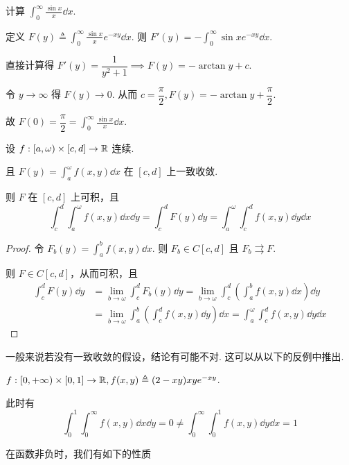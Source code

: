 \begin{example}
    计算 $\displaystyle\int_0^\infty\frac{\sin x}{x}\dd x$.

    定义 $F(y)\triangleq\displaystyle\int_0^\infty\frac{\sin x}{x}e^{-xy}\dd x$. 则 $F'(y)=-\displaystyle\int_0^\infty \sin x e^{-xy}\dd x$.

    直接计算得 $F'(y)=\dfrac{1}{y^2+1}\implies F(y)=-\arctan y+c$.

    令 $y\to\infty$ 得 $F(y)\to 0$. 从而 $c=\dfrac{\pi}{2},F(y)=-\arctan y+\dfrac{\pi}{2}$.

    故 $F(0)=\dfrac{\pi}{2}=\displaystyle\int_0^\infty\frac{\sin x}{x}\dd x$.
\end{example}


\begin{property}
    设 $f:[a,\omega)\times [c,d]\to\mathbb{R}$ 连续.

    且 $F(y)=\displaystyle\int_a^\omega f(x,y)\dd x$ 在 $[c,d]$ 上一致收敛.

    则 $F$ 在 $[c,d]$ 上可积，且
$$
\int_c^d\int_a^\omega f(x,y)\dd x\dd y=\int_c^dF(y)\dd y=\int_a^\omega\int_c^d f(x,y)\dd y\dd x
$$
\end{property}
\begin{proof}
    令 $F_b(y)=\displaystyle\int_a^bf(x,y)\dd x$. 则 $F_b\in C[c,d]$ 且 $F_b\rightrightarrows F$.

    则 $F\in C[c,d]$，从而可积，且
$$
\begin{aligned}
    \int_c^dF(y)\dd y&=\lim_{b\to\omega}\int_c^d F_b(y)\dd y=\lim_{b\to\omega}\int_c^d\left(\int_a^b f(x,y)\dd x\right)\dd y\\
    &=\lim_{b\to\omega}\int_a^b\left(\int_c^df(x,y)\dd y\right)\dd x=\int_a^\omega\int_c^d f(x,y)\dd y\dd x
\end{aligned}
$$
\end{proof}

\begin{hint}
    一般来说若没有一致收敛的假设，结论有可能不对. 这可以从以下的反例中推出.
\end{hint}

\begin{example}
    $f:[0,+\infty)\times [0,1]\to\mathbb{R},f(x,y)\triangleq(2-xy)xye^{-xy}$.

    此时有
$$
\int_0^1\int_0^\infty f(x,y)\dd x\dd y=0\ne\int_0^\infty\int_0^1f(x,y)\dd y\dd x=1
$$
\end{example}

在函数非负时，我们有如下的性质


